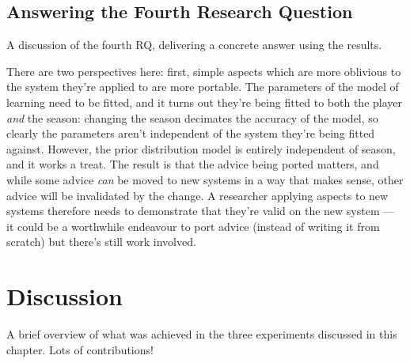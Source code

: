 \subsection{Answering the Fourth Research Question}

A discussion of the fourth RQ, delivering a concrete answer using the results.

There are two perspectives here: first, simple aspects which are more oblivious
to the system they're applied to are more portable. The parameters of the model
of learning need to be fitted, and it turns out they're being fitted to both the
player \emph{and} the season: changing the season decimates the accuracy of the
model, so clearly the parameters aren't independent of the system they're being
fitted against. However, the prior distribution model is entirely independent of
season, and it works a treat. The result is that the advice being ported
matters, and while some advice \emph{can} be moved to new systems in a way that
makes sense, other advice will be invalidated by the change. A researcher
applying aspects to new systems therefore needs to demonstrate that they're
valid on the new system --- it could be a worthwhile endeavour to port advice
(instead of writing it from scratch) but there's still work involved.





\section{Discussion}

A brief overview of what was achieved in the three experiments discussed in this
chapter. Lots of contributions!




